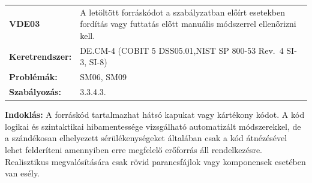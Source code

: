 \documentclass[12pt,magyar,a4paper,oneside]{scrreprt}
\begin{document}
\begin{longtable}[]{@{}ll@{}}
\toprule
\endhead
\begin{minipage}[t]{0.16\columnwidth}\raggedright
\textbf{VDE03}\strut
\end{minipage} & \begin{minipage}[t]{0.79\columnwidth}\raggedright
A letöltött forráskódot a szabályzatban előírt esetekben fordítás vagy
futtatás előtt manuális módszerrel ellenőrizni kell.\strut
\end{minipage}\tabularnewline
\begin{minipage}[t]{0.16\columnwidth}\raggedright
\textbf{Keretrendszer:}\strut
\end{minipage} & \begin{minipage}[t]{0.79\columnwidth}\raggedright
DE.CM-4 (COBIT 5 DSS05.01,NIST SP 800-53 Rev.~4 SI-3, SI-8)\strut
\end{minipage}\tabularnewline
\begin{minipage}[t]{0.16\columnwidth}\raggedright
\textbf{Problémák:}\strut
\end{minipage} & \begin{minipage}[t]{0.79\columnwidth}\raggedright
SM06, SM09\strut
\end{minipage}\tabularnewline
\begin{minipage}[t]{0.16\columnwidth}\raggedright
\textbf{Szabályozás:}\strut
\end{minipage} & \begin{minipage}[t]{0.79\columnwidth}\raggedright
3.3.4.3.\strut
\end{minipage}\tabularnewline
\bottomrule
\end{longtable}

\textbf{Indoklás: } A forráskód tartalmazhat hátsó kapukat vagy
kártékony kódot. A kód logikai és szintaktikai hibamentessége
vizsgálható automatizált módszerekkel, de a szándékosan elhelyezett
sérülékenységeket általában csak a kód átnézésével lehet felderíteni
amennyiben erre megfelelő erőforrás áll rendelkezésre. Realisztikus
megvalósítására csak rövid parancsfájlok vagy komponensek esetében van
esély.
\end{document}
